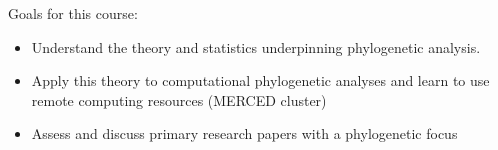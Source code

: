 \documentclass{beamer}
\begin{document}
\begin{frame}
Goals for this course:
\begin{itemize}
 \item Understand the theory and statistics underpinning phylogenetic analysis.
 \item Apply this theory to computational phylogenetic analyses and learn to use remote computing resources (MERCED cluster)
 \item Assess and discuss primary research papers with a phylogenetic focus
\end{itemize}
\end{frame}
\end{document}
